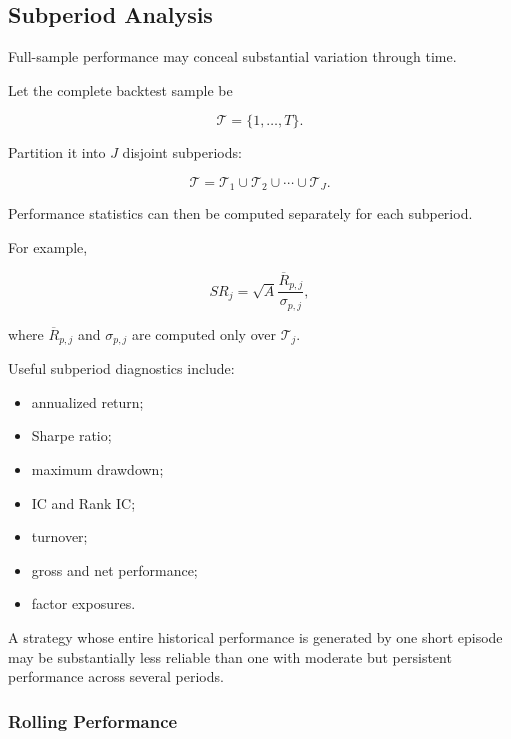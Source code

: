 \documentclass[11pt,a4paper]{article}
\begin{document}
\subsection{Subperiod Analysis}
\label{subsec:subperiod_analysis}

Full-sample performance may conceal substantial variation through time.

Let the complete backtest sample be

\begin{equation}
\mathcal{T}
=
\{1,\ldots,T\}.
\end{equation}

Partition it into $J$ disjoint subperiods:

\begin{equation}
\boxed{
\mathcal{T}
=
\mathcal{T}_1
\cup
\mathcal{T}_2
\cup
\cdots
\cup
\mathcal{T}_J.
}
\end{equation}

Performance statistics can then be computed separately for each subperiod.

For example,

\begin{equation}
SR_j
=
\sqrt{A}
\frac{
\overline{R}_{p,j}
}{
\sigma_{p,j}
},
\end{equation}

where $\overline{R}_{p,j}$ and $\sigma_{p,j}$ are computed only over
$\mathcal{T}_j$.

Useful subperiod diagnostics include:

\begin{itemize}
    \item annualized return;
    \item Sharpe ratio;
    \item maximum drawdown;
    \item IC and Rank IC;
    \item turnover;
    \item gross and net performance;
    \item factor exposures.
\end{itemize}

A strategy whose entire historical performance is generated by one short
episode may be substantially less reliable than one with moderate but persistent
performance across several periods.


\subsubsection{Rolling Performance}
\end{document}
